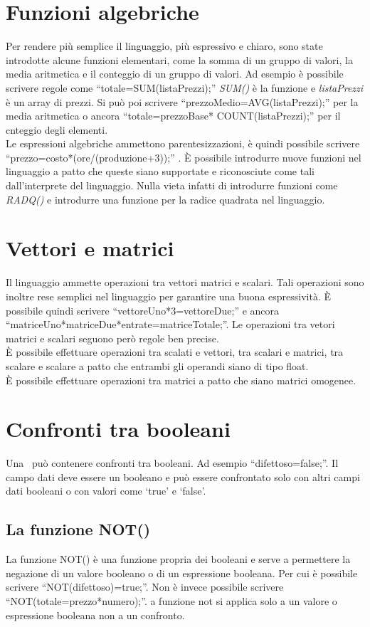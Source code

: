 \begin{center}
\section{Funzioni algebriche}
Per rendere pi\`u semplice il linguaggio, pi\`u espressivo e chiaro, sono state introdotte alcune funzioni elementari, come la somma di un gruppo di valori, la media aritmetica e il conteggio di un gruppo di valori. Ad esempio \`e possibile scrivere regole come ``totale=SUM(listaPrezzi);'' \textit{SUM()} \`e la funzione e \textit{listaPrezzi} \`e un array di prezzi. Si pu\`o poi scrivere ``prezzoMedio=AVG(listaPrezzi);'' per la media aritmetica   o ancora ``totale=prezzoBase* COUNT(listaPrezzi);'' per il cnteggio degli elementi.\\
Le espressioni algebriche ammettono parentesizzazioni, \`e quindi possibile scrivere ``prezzo=costo*(ore/(produzione+3));'' .
\`E possibile introdurre nuove funzioni nel linguaggio a patto che queste siano supportate e riconosciute come tali dall'interprete del linguaggio. Nulla vieta infatti di introdurre funzioni come \textit{RADQ()} e introdurre una funzione per la radice quadrata nel linguaggio.

\section{Vettori e matrici}
Il linguaggio ammette operazioni tra vettori matrici e scalari. Tali operazioni sono inoltre rese semplici nel linguaggio per garantire una buona espressivit\`a. \`E possibile quindi scrivere ``vettoreUno*3=vettoreDue;'' e ancora ``matriceUno*matriceDue*entrate=matriceTotale;''. Le operazioni tra vetori matrici e scalari seguono per\`o regole ben precise.\\
\`E possibile effettuare operazioni tra scalati e vettori, tra scalari e matrici, tra scalare e scalare a patto che entrambi gli operandi siano di tipo float.\\
\`E possibile effettuare operazioni tra matrici a patto che siano matrici omogenee.

\section{Confronti tra booleani}
Una \br\ pu\`o contenere confronti tra booleani. Ad esempio ``difettoso=false;''. Il campo dati deve essere un booleano e pu\`o essere confrontato solo con altri campi dati booleani o con valori come `true' e `false'. 
\subsection{La funzione NOT()}
La funzione NOT() \`e una funzione propria dei booleani e serve a permettere la negazione di un valore booleano o di un espressione booleana. Per cui \`e possibile scrivere ``NOT(difettoso)=true;''. Non \`e invece possibile scrivere ``NOT(totale=prezzo*numero);''. a funzione not si applica solo a un valore o espressione booleana non a un confronto.

\end{center}
